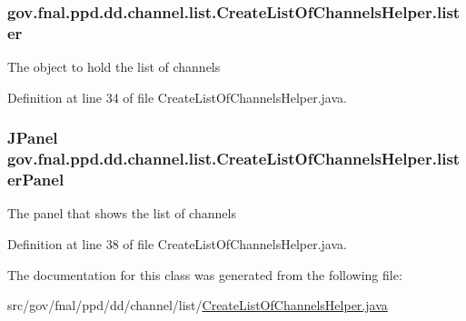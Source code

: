 \hypertarget{classgov_1_1fnal_1_1ppd_1_1dd_1_1channel_1_1list_1_1CreateListOfChannelsHelper_ad9a55e586ea2b5d8775ec9b9bafbc8bf}{
\subsubsection[{lister}]{ gov.\-fnal.\-ppd.\-dd.\-channel.\-list.\-Create\-List\-Of\-Channels\-Helper.\-lister}}\label{classgov_1_1fnal_1_1ppd_1_1dd_1_1channel_1_1list_1_1CreateListOfChannelsHelper_ad9a55e586ea2b5d8775ec9b9bafbc8bf}
The object to hold the list of channels 

Definition at line 34 of file Create\-List\-Of\-Channels\-Helper.\-java.

\hypertarget{classgov_1_1fnal_1_1ppd_1_1dd_1_1channel_1_1list_1_1CreateListOfChannelsHelper_af7f5d450eff8fc117d70ddd5e0621308}{
\subsubsection[{lister\-Panel}]{\setlength{\rightskip}{0pt plus 5cm}J\-Panel gov.\-fnal.\-ppd.\-dd.\-channel.\-list.\-Create\-List\-Of\-Channels\-Helper.\-lister\-Panel}}\label{classgov_1_1fnal_1_1ppd_1_1dd_1_1channel_1_1list_1_1CreateListOfChannelsHelper_af7f5d450eff8fc117d70ddd5e0621308}
The panel that shows the list of channels 

Definition at line 38 of file Create\-List\-Of\-Channels\-Helper.\-java.



The documentation for this class was generated from the following file\-:\begin{DoxyCompactItemize}
\item 
src/gov/fnal/ppd/dd/channel/list/\hyperlink{CreateListOfChannelsHelper_8java}{Create\-List\-Of\-Channels\-Helper.\-java}\end{DoxyCompactItemize}
